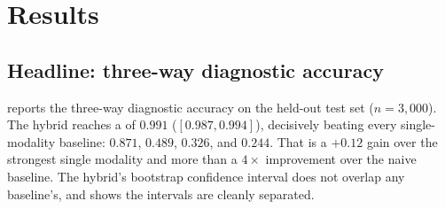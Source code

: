 \section{Results}
\label{sec:results}

\subsection{Headline: three-way diagnostic accuracy}
\label{sec:headline}

 reports the three-way diagnostic accuracy on the held-out test
set ($n = 3{,}000$). The hybrid reaches a \macrofone of $\mathbf{0.991}$
($[0.987, 0.994]$), decisively beating every single-modality baseline:
\symonly{} $0.871$, \bayonly{} $0.489$, \tostonly{} $0.326$, and \nhst{} $0.244$.
That is a $+0.12$ gain over the strongest single modality and more than a
$4\times$ improvement over the naive baseline. The hybrid's bootstrap confidence
interval does not overlap any baseline's, and  shows the
intervals are cleanly separated.

\begin{table}[t]
\centering
\caption{Three-way cause-classification on the held-out test set ($n=3{,}000$,
classes $[1001,989,1010]$). Higher is better except ECE. \GR{}/\WI{}/\DF{} columns
are per-class F1. Best in \textbf{bold}. The hybrid dominates on every metric; the
two single modalities each collapse on a different class (\bayonly{} on \DF,
\symonly{} via robustness$\leftrightarrow$weak confusion reflected in its high
ECE). $^\dagger$The LLM judge is scored on a stratified 150-scenario subset; all
others on the full test set.}
\label{tab:main}
\end{table}

